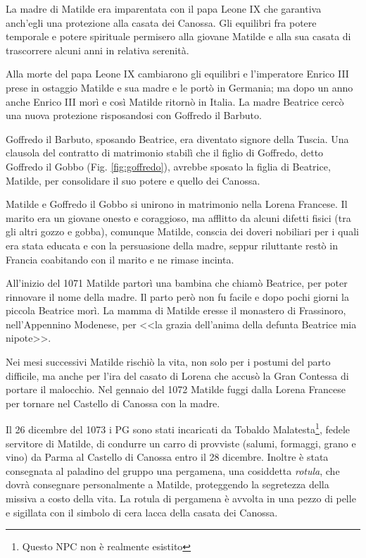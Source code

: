 \documentclass[letterpaper,twocolumn,openany,nodeprecatedcode]{dndbook}
\begin{document}
La madre di Matilde era imparentata con il papa Leone IX che garantiva anch'egli una protezione alla casata dei Canossa. Gli equilibri fra potere temporale e potere spirituale permisero alla giovane Matilde e alla sua casata di trascorrere alcuni anni in relativa serenità.

Alla morte del papa Leone IX cambiarono gli equilibri e l'imperatore Enrico III prese in ostaggio Matilde e sua madre e le portò in Germania; ma dopo un anno anche Enrico III morì e così Matilde ritornò in Italia. La madre Beatrice cercò una nuova protezione risposandosi con Goffredo il Barbuto.

Goffredo il Barbuto, sposando Beatrice, era diventato signore della Tuscia. Una clausola del contratto di matrimonio stabilì che il figlio di Goffredo, detto Goffredo il Gobbo (Fig. \ref{fig:goffredo}), avrebbe sposato la figlia di Beatrice, Matilde, per consolidare il suo potere e quello dei Canossa.

Matilde e Goffredo il Gobbo si unirono in matrimonio nella Lorena Francese. Il marito era un giovane onesto e coraggioso, ma afflitto da alcuni difetti fisici (tra gli altri gozzo e gobba), comunque Matilde, conscia dei doveri nobiliari per i quali era stata educata e con la persuasione della madre, seppur riluttante restò in Francia coabitando con il marito e ne rimase incinta.

All'inizio del 1071 Matilde partorì una bambina che chiamò Beatrice, per poter rinnovare il nome della madre. Il parto però non fu facile e dopo pochi giorni la piccola Beatrice morì. La mamma di Matilde eresse il monastero di Frassinoro, nell'Appennino Modenese, per <<la grazia dell'anima della defunta Beatrice mia nipote>>.

Nei mesi successivi Matilde rischiò la vita, non solo per i postumi del parto difficile, ma anche per l'ira del casato di Lorena che accusò la Gran Contessa di portare il malocchio. Nel gennaio del 1072 Matilde fuggi dalla Lorena Francese per tornare nel Castello di Canossa con la madre.

Il 26 dicembre del 1073 i PG sono stati incaricati da Tobaldo Malatesta\footnote{Questo NPC non è realmente esistito}, fedele servitore di Matilde, di condurre un carro di provviste (salumi, formaggi, grano e vino) da Parma al Castello di Canossa entro il 28 dicembre. Inoltre è stata consegnata al paladino del gruppo  una pergamena, una cosiddetta \textit{rotula}, che dovrà consegnare personalmente a Matilde, proteggendo la segretezza della missiva a costo della vita. La rotula di pergamena è avvolta in una pezzo di pelle e sigillata con il simbolo di cera lacca della casata dei Canossa. 
\end{document}
